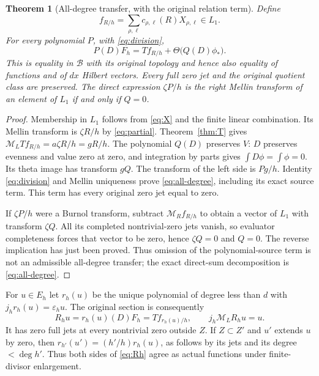 \documentclass[11pt]{article}
\newtheorem{theorem}{Theorem}[section]
\newcommand{\B}{\mathscr B}\newcommand{\HH}{\mathcal H}
\newcommand{\ML}{\mathcal M_{\!L}}\newcommand{\MR}{\mathcal M_{\!R}}
\begin{document}
\begin{theorem}[All-degree transfer, with the original relation term]
\label{thm:all-degree}
Define
\begin{equation}\label{eq:fR}
 f_{R/h}=\sum_{\rho,\ell}c_{\rho,\ell}(R)X_{\rho,\ell}\in L_1.
\end{equation}
For every polynomial $P$, with \eqref{eq:division},
\begin{equation}\label{eq:all-degree}
 \boxed{\quad P(D)F_h=T f_{R/h}+\Theta\bigl(Q(D)\phi_*\bigr).\quad}
\end{equation}
This is equality in $\B$ with its original topology and hence
also equality of functions and of $dx$ Hilbert vectors. Every
full zero jet and the original quotient class are preserved.
The direct expression $\zeta P/h$ is the right Mellin transform
of an element of $L_1$ if and only if $Q=0$.
\end{theorem}
\begin{proof}
Membership in $L_1$ follows from \eqref{eq:X} and the finite
linear combination. Its Mellin transform is $\zeta R/h$ by
\eqref{eq:partial}. Theorem~\ref{thm:T} gives
$\ML T f_{R/h}=a\zeta R/h=gR/h$. The polynomial $Q(D)$
preserves $V$: $D$ preserves evenness and value zero at zero,
and integration by parts gives $\int D\phi=\int\phi=0$.
Its theta image has transform $gQ$. The transform of the left
side is $Pg/h$. Identity \eqref{eq:division} and Mellin
uniqueness prove \eqref{eq:all-degree}, including its exact
source term. This term has every original zero jet equal to zero.

If $\zeta P/h$ were a Burnol transform, subtract
$\MR f_{R/h}$ to obtain a vector of $L_1$ with transform
$\zeta Q$. All its completed nontrivial-zero jets vanish,
so evaluator completeness forces that vector to be zero, hence
$\zeta Q=0$ and $Q=0$. The reverse implication has just been
proved. Thus omission of the polynomial-source term is not
an admissible all-degree transfer; the exact direct-sum
decomposition is \eqref{eq:all-degree}.
\end{proof}

For $u\in E_h$ let $r_h(u)$ be the unique polynomial of degree
less than $d$ with $j_hr_h(u)=\varepsilon_hu$. The original
section is consequently
\begin{equation}\label{eq:Rh}
 R_hu=r_h(u)(D)F_h=T f_{r_h(u)/h},\qquad
 j_h\ML R_hu=u.
\end{equation}
It has zero full jets at every nontrivial zero outside $Z$.
If $Z\subset Z'$ and $u'$ extends $u$ by zero, then
$r_{h'}(u')=(h'/h)r_h(u)$, as follows by its jets and its
degree $<\deg h'$. Thus both sides of \eqref{eq:Rh} agree
as actual functions under finite-divisor enlargement.
\end{document}
